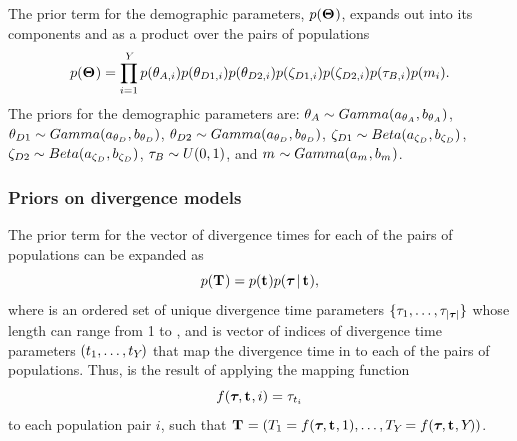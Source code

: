 \documentclass[letterpaper,12pt]{article}
\begin{document}
\begin{linenumbers}
\begin{linenomath}
The prior term for the demographic parameters, $p(\mathbf{\Theta_{}})$,
expands out into its components and as a product over the \npairs{}
pairs of populations
\begin{equation}
    p(\demographicParamVector) =
    \prod_{i=1}^{\npairs{}}
    p(\ancestralTheta{i})
    p(\descendantTheta{1}{i})
    p(\descendantTheta{2}{i})
    p(\bottleScalar{1}{i})
    p(\bottleScalar{2}{i})
    p(\bottleTime{i})
    p(\migrationRate{i}).
    \label{eq:demographicPrior}
\end{equation}
The priors for the demographic parameters are:
$\ancestralTheta{} \sim Gamma(\gammaShape{\ancestralTheta{}},
\gammaScale{\ancestralTheta{}})$,
$\descendantTheta{1}{} \sim Gamma(\gammaShape{\descendantTheta{}{}},
\gammaScale{\descendantTheta{}{}})$,
$\descendantTheta{2}{} \sim Gamma(\gammaShape{\descendantTheta{}{}},
\gammaScale{\descendantTheta{}{}})$,
$\bottleScalar{1}{} \sim Beta(\betaA{\bottleScalar{}{}},
\betaB{\bottleScalar{}{}})$,
$\bottleScalar{2}{} \sim Beta(\betaA{\bottleScalar{}{}},
\betaB{\bottleScalar{}{}})$,
$\bottleTime{} \sim U(0, 1)$,
and
$m_{} \sim Gamma(a_{m_{}},
b_{m_{}})$.
\end{linenomath}

\subsubsection*{Priors on divergence models}
\begin{linenomath}
The prior term for the vector of divergence times for each of
the \npairs{} pairs of populations can be expanded as
\begin{equation}
    p(\mathbf{T_{}}) = p(\mathbf{t_{}})p(\boldsymbol{\tau_{}} \,|\, \mathbf{t_{}}),
    \label{eq:divModelPrior}
\end{equation}
where \divTimeVector is an ordered set of unique divergence time parameters
$\{\tau_{1}, \ldots, \tau_{\lvert \boldsymbol{\tau_{}} \rvert}\}$ whose length
\divTimeNum can range from 1 to \npairs{},
and \divTimeIndexVector is vector of indices of divergence time parameters 
$(t_{1}, \ldots, t_{Y_{}})$
that map the divergence time in \divTimeVector to each of the \npairs{}
pairs of populations.
Thus, \divTimeMapVector is the result of applying the mapping function
\begin{equation}
    f(\boldsymbol{\tau_{}}, \mathbf{t_{}}, i) = \tau_{t_{i}}
    \label{eq:divTimeMapFunction}
\end{equation}
to each population pair $i$, such that
$\mathbf{T_{}} = (T_{1} = f(\boldsymbol{\tau_{}}, \mathbf{t_{}},
1), \ldots, T_{Y_{}} = f(\boldsymbol{\tau_{}}, \mathbf{t_{}},
Y_{}))$.
\end{linenomath}


\end{linenumbers}
\end{document}
